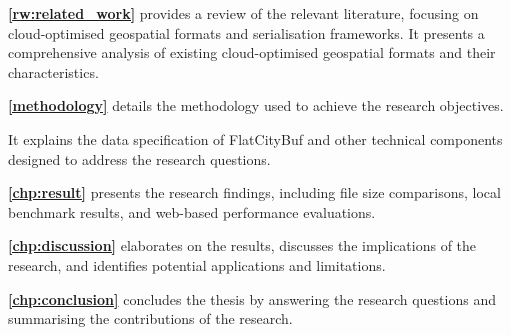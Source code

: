\textbf{\autoref{rw:related_work}} provides a review of the relevant literature, focusing on cloud-optimised geospatial formats and serialisation frameworks.
It presents a comprehensive analysis of existing cloud-optimised geospatial formats and their characteristics.

\textbf{\autoref{methodology}} details the methodology used to achieve the research objectives.

It explains the data specification of FlatCityBuf and other technical components designed to address the research questions.

\textbf{\autoref{chp:result}} presents the research findings, including file size comparisons, local benchmark results, and web-based performance evaluations.

\textbf{\autoref{chp:discussion}} elaborates on the results, discusses the implications of the research, and identifies potential applications and limitations.

\textbf{\autoref{chp:conclusion}} concludes the thesis by answering the research questions and summarising the contributions of the research.